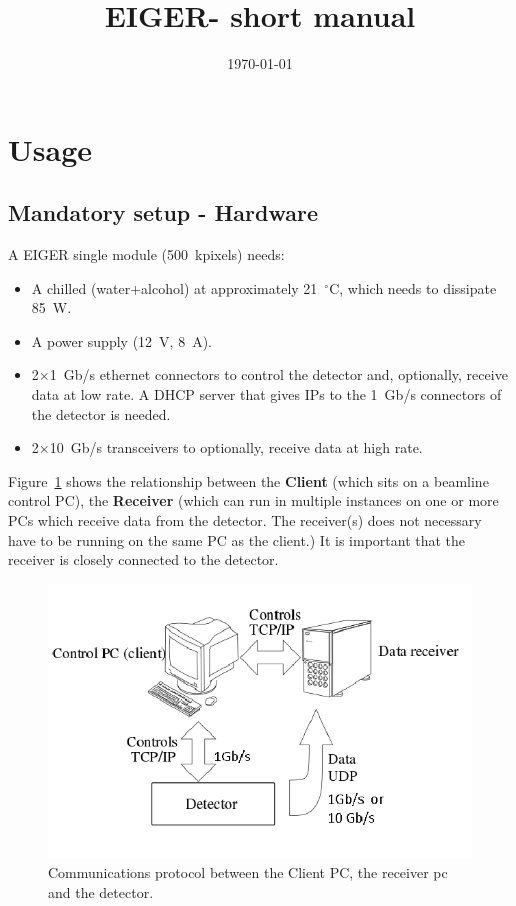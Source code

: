 \documentclass{article}
\newcommand{\E}{EIGER\xspace}
\begin{document}
\title{\E - short manual}
\date{\today}
\maketitle

\section{Usage}

\subsection{Mandatory setup - Hardware}
A EIGER single module (500~kpixels) needs:
\begin{itemize}
\item A chilled (water+alcohol) at approximately 21~$^{\circ}$C, which needs to dissipate 85~W.
\item A power supply (12~V, 8~A).
\item 2$\times$1~Gb/s ethernet connectors to control the detector and, optionally, receive data at low rate. A DHCP server that gives IPs to the 1~Gb/s connectors of the detector is needed.
\item 2$\times$10~Gb/s transceivers to optionally, receive data at high rate.
 \end{itemize}

Figure~\ref{fig:1} shows the relationship between the \textbf{Client} (which sits on a beamline control PC), the \textbf{Receiver} (which can run in multiple instances on one or more PCs which receive data from the detector. The receiver(s) does not necessary have to be running on the same PC as the client.) It is important that the receiver is closely connected to the detector.

\begin{figure}[t]
\begin{center}
\includegraphics[width=.8\textwidth]{Client2}
\end{center}
\caption{Communications protocol between the Client PC, the receiver pc and the detector.}
\label{fig:1}
\end{figure}
\end{document}
